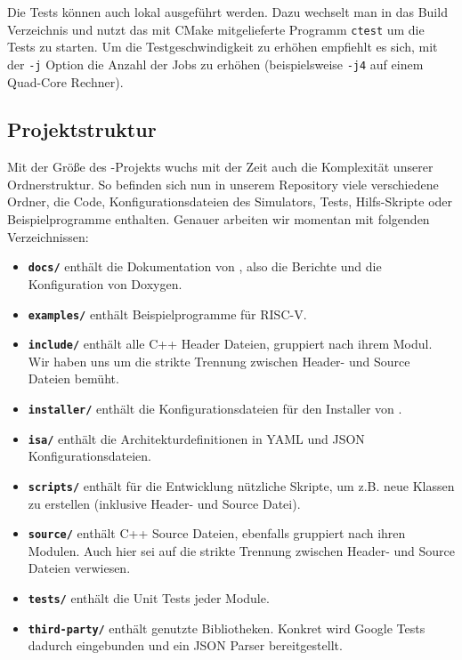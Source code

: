 Die Tests können auch lokal ausgeführt werden. Dazu wechselt man in das Build
Verzeichnis und nutzt das mit CMake mitgelieferte Programm \texttt{ctest} um die
Tests zu starten. Um die Testgeschwindigkeit zu erhöhen empfiehlt es sich, mit
der \texttt{-j} Option die Anzahl der Jobs zu erhöhen (beispielsweise
\texttt{-j4} auf einem Quad-Core Rechner).

\subsection{Projektstruktur}

Mit der Größe des \erasim{}-Projekts wuchs mit der Zeit auch die Komplexität
unserer Ordnerstruktur. So befinden sich nun in unserem Repository viele
verschiedene Ordner, die Code, Konfigurationsdateien des Simulators, Tests,
Hilfs-Skripte oder Beispielprogramme enthalten. Genauer arbeiten wir momentan
mit folgenden Verzeichnissen:

\begin{itemize}
	\item \textbf{\texttt{docs/}} enthält die Dokumentation von \erasim{}, also
	die Berichte und die Konfiguration von Doxygen.
	\item \textbf{\texttt{examples/}} enthält Beispielprogramme für RISC-V.
	\item \textbf{\texttt{include/}} enthält alle C++ Header Dateien, gruppiert
	nach ihrem Modul. Wir haben uns um die strikte Trennung zwischen Header- und
	Source Dateien bemüht.
	\item \textbf{\texttt{installer/}} enthält die Konfigurationsdateien für
	den Installer von \erasim{}.
	\item \textbf{\texttt{isa/}} enthält die Architekturdefinitionen in YAML und
	JSON Konfigurationsdateien.
	\item \textbf{\texttt{scripts/}} enthält für die Entwicklung nützliche
	Skripte, um z.B. neue Klassen zu erstellen (inklusive Header- und
	Source Datei).
	\item \textbf{\texttt{source/}} enthält C++ Source Dateien, ebenfalls
	gruppiert nach ihren Modulen. Auch hier sei auf die strikte Trennung
	zwischen Header- und Source Dateien verwiesen.
	\item \textbf{\texttt{tests/}} enthält die Unit Tests jeder Module.
	\item \textbf{\texttt{third-party/}} enthält genutzte Bibliotheken. Konkret
	wird Google Tests dadurch eingebunden und ein JSON Parser bereitgestellt.
\end{itemize}

